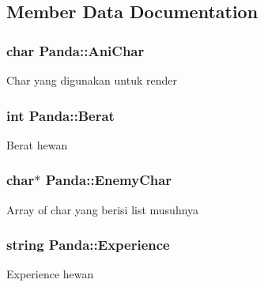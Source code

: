 \subsection{Member Data Documentation}
\subsubsection[{\texorpdfstring{Ani\+Char}{AniChar}}]{\setlength{\rightskip}{0pt plus 5cm}char Panda\+::\+Ani\+Char\hspace{0.3cm}{\ttfamily [protected]}}\hypertarget{class_panda_acd1fabf24e6e6fc3b7ab6c1b5d48a52d}{}\label{class_panda_acd1fabf24e6e6fc3b7ab6c1b5d48a52d}
Char yang digunakan untuk render 
\subsubsection[{\texorpdfstring{Berat}{Berat}}]{\setlength{\rightskip}{0pt plus 5cm}int Panda\+::\+Berat\hspace{0.3cm}{\ttfamily [protected]}}\hypertarget{class_panda_a10fe110338d0894670f3ccb999f05203}{}\label{class_panda_a10fe110338d0894670f3ccb999f05203}
Berat hewan 
\subsubsection[{\texorpdfstring{Enemy\+Char}{EnemyChar}}]{\setlength{\rightskip}{0pt plus 5cm}char$\ast$ Panda\+::\+Enemy\+Char\hspace{0.3cm}{\ttfamily [protected]}}\hypertarget{class_panda_aa7bba0354b3f860015ea684eb63ee5ba}{}\label{class_panda_aa7bba0354b3f860015ea684eb63ee5ba}
Array of char yang berisi list musuhnya 
\subsubsection[{\texorpdfstring{Experience}{Experience}}]{\setlength{\rightskip}{0pt plus 5cm}string Panda\+::\+Experience\hspace{0.3cm}{\ttfamily [protected]}}\hypertarget{class_panda_a47fd91f8221015d62fcb4987ef213dcc}{}\label{class_panda_a47fd91f8221015d62fcb4987ef213dcc}
Experience hewan 
